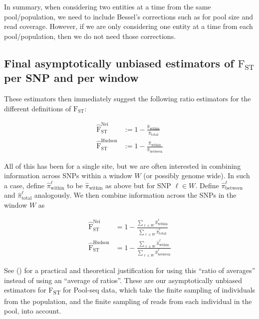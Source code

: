 \documentclass[letterpaper,fontsize=9pt,DIV=12]{scrartcl}
\newcommand\citeay[1]{\citeauthor{#1} (\citeyear{#1}) \cite{#1}}
\newcommand{\fst}{F\textsubscript{ST}}
\begin{document}
In summary, when considering two entities at a time from the same pool/population, we need to include Bessel's corrections such as for pool size and read coverage. However, if we are only considering one entity at a time from each pool/population, then we do not need those corrections.


\subsection{Final asymptotically unbiased estimators of \texorpdfstring{$\text{F}_\text{ST}$}{FST} per SNP and per window}
\label{supp:sec:FST:sub:EstimatorFST}

These estimators then immediately suggest the following ratio estimators for the different definitions of $\text{F}_\text{ST}$:

\begin{align}
    \widehat{\text{F}}_\text{ST}^\text{Nei} &:= 1 - \frac{\widehat{\pi}_\text{within}}{\widehat{\pi}_\text{total}}\\
    \widehat{\text{F}}_\text{ST}^\text{Hudson} &:= 1 - \frac{\widehat{\pi}_\text{within}}{\widehat{\pi}_\text{between}}
\end{align}

All of this has been for a single site, but we are often interested in combining information across SNPs within a window $W$ (or possibly genome wide).
In such a case, define $\widehat{\pi}^\ell_\text{within}$ to be $\widehat{\pi}_\text{within}$ as above but for SNP $\ell \in W$.
Define $\widehat{\pi}^\ell_\text{between}$ and $\widehat{\pi}^\ell_\text{total}$ analogously.
We then combine information across the SNPs in the window $W$ as

\begin{align}
    \widehat{\text{F}}_\text{ST}^\text{Nei}    &= 1 - \frac{\sum_{\ell \in W} \widehat{\pi}^\ell_\text{within}} {\sum_{\ell \in W} \widehat{\pi}^\ell_\text{total}} \\
    \widehat{\text{F}}_\text{ST}^\text{Hudson} &= 1 - \frac{\sum_{\ell \in W} \widehat{\pi}^\ell_\text{within}} {\sum_{\ell \in W} \widehat{\pi}^\ell_\text{between}}
\end{align}

See \citeay{Bhatia2013} for a practical and theoretical justification for using this ``ratio of averages'' instead of using an ``average of ratios''.
These are our asymptotically unbiased estimators for \fst{} for Pool-seq data, which take the finite sampling of individuals from the population, and the finite sampling of reads from each individual in the pool, into account.
\end{document}
